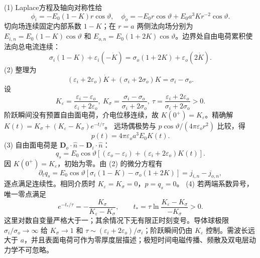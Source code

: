(1) Laplace方程及轴向对称性给
\[
\phi_i=-E_0(1-K)r\cos\vartheta,\quad
\phi_o=-E_0r\cos\vartheta+E_0a^3K r^{-2}\cos\vartheta.
\]
切向场连续固定内部系数 \(1-K\)；在 \(r=a\) 两侧法向场分别为 \(E_{i,n}=E_0(1-K)\cos\vartheta\) 和 \(E_{o,n}=E_0(1+2K)\cos\vartheta\)。边界处自由电荷累积使法向总电流连续：
\[
\sigma_i(1-K)+\varepsilon_i(-\dot K)
=\sigma_o(1+2K)+\varepsilon_o(2\dot K).
\]
(2) 整理为
\[
(\varepsilon_i+2\varepsilon_o)\dot K+
(\sigma_i+2\sigma_o)K=\sigma_i-\sigma_o.
\]
设
\[
K_\varepsilon=\frac{\varepsilon_i-\varepsilon_o}{\varepsilon_i+2\varepsilon_o},\
K_\sigma=\frac{\sigma_i-\sigma_o}{\sigma_i+2\sigma_o},\
\tau=\frac{\varepsilon_i+2\varepsilon_o}{\sigma_i+2\sigma_o}>0 .
\]
阶跃瞬间没有预置自由面电荷，介电位移连续，故 \(K(0^+)=K_\varepsilon\)。精确解
\(K(t)=K_\sigma+(K_\varepsilon-K_\sigma)e^{-t/\tau}\)。
远场偶极势与 \(p\cos\vartheta/(4\pi\varepsilon_or^2)\) 比较，得
\[
p(t)=4\pi\varepsilon_oa^3E_0K(t).
\]
(3) 自由面电荷是 \(\boldsymbol D_o\cdot\hat n-\boldsymbol D_i\cdot\hat n\)：
\[
q_s=E_0\cos\vartheta[(\varepsilon_o-\varepsilon_i)+
(\varepsilon_i+2\varepsilon_o)K(t)].
\]
因 \(K(0^+)=K_\varepsilon\)，初始为零。由 (2) 的微分方程有
\[
\partial_t q_s=E_0\cos\vartheta[
\sigma_i(1-K)-\sigma_o(1+2K)]
=j_{i,n}-j_{o,n},
\]
逐点满足连续性。相同介质时 \(K_\varepsilon=K_\sigma=0\)，\(p=q_s=0\)。
(4) 若两端系数异号，唯一零点满足
\[
e^{-t_*/\tau}=-\frac{K_\sigma}{K_\varepsilon-K_\sigma},\qquad
t_*=\tau\ln\frac{K_\varepsilon-K_\sigma}{-K_\sigma}>0.
\]
这里对数自变量严格大于一；其余情况下无有限正时刻变号。导体球极限 \(\sigma_i/\sigma_o\to\infty\) 给 \(K_\sigma\to1\) 和 \(\tau\sim(\varepsilon_i+2\varepsilon_o)/\sigma_i\)；阶跃瞬间仍由 \(K_\varepsilon\) 控制。需波长远大于 \(a\)，并且表面电荷可作为零厚度层描述；极短时间电磁传播、频散及双电层动力学不可忽略。
